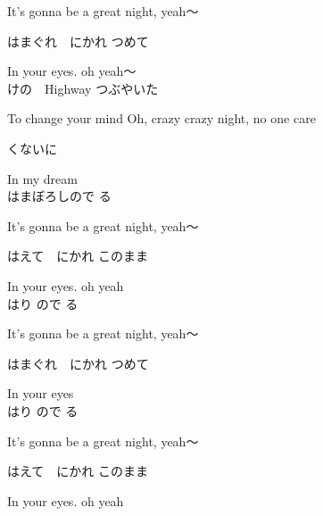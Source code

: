 \documentclass[]{article}
\begin{document}
\begin{spacing}{1.15}
{{It's gonna be a great night, yeah～

はまぐれ　にかれ
つめて　

In your eyes. oh yeah～
\\

けの　Highway
つぶやいた　

To change your mind
Oh, crazy crazy night, no one care

くないに　

In my dream
\\

はまぼろしので
る　

It's gonna be a great night, yeah～

はえて　にかれ
このまま 

In your eyes. oh yeah
\\

はり
ので
る　

It's gonna be a great night, yeah～

はまぐれ　にかれ
つめて　

In your eyes
\\

はり
ので
る　

It's gonna be a great night, yeah～

はえて　にかれ
このまま 

In your eyes. oh yeah
}
}
\end{spacing}
\end{document}
